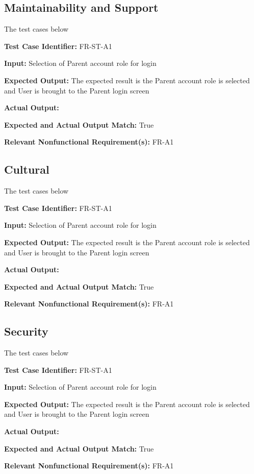 \documentclass[12pt, titlepage]{article}
\begin{document}
\subsection{Maintainability and Support}
\hspace{2em}The test cases below 

\begin{mdframed}[linewidth=0.5mm] \par
  \textbf{Test Case Identifier:} FR-ST-A1 \par
  \textbf{Input:} Selection of Parent account role for login \par
  \textbf{Expected Output:} The expected result is the Parent account role is selected and User is brought to the Parent login screen \par
  \textbf{Actual Output:} \par
  \textbf{Expected and Actual Output Match:} True \par
  \textbf{Relevant Nonfunctional Requirement(s):} FR-A1
\end{mdframed}

\subsection{Cultural}
\hspace{2em}The test cases below 

\begin{mdframed}[linewidth=0.5mm] \par
  \textbf{Test Case Identifier:} FR-ST-A1 \par
  \textbf{Input:} Selection of Parent account role for login \par
  \textbf{Expected Output:} The expected result is the Parent account role is selected and User is brought to the Parent login screen \par
  \textbf{Actual Output:} \par
  \textbf{Expected and Actual Output Match:} True \par
  \textbf{Relevant Nonfunctional Requirement(s):} FR-A1
\end{mdframed}

\subsection{Security}
\hspace{2em}The test cases below 

\begin{mdframed}[linewidth=0.5mm] \par
  \textbf{Test Case Identifier:} FR-ST-A1 \par
  \textbf{Input:} Selection of Parent account role for login \par
  \textbf{Expected Output:} The expected result is the Parent account role is selected and User is brought to the Parent login screen \par
  \textbf{Actual Output:} \par
  \textbf{Expected and Actual Output Match:} True \par
  \textbf{Relevant Nonfunctional Requirement(s):} FR-A1
\end{mdframed}
\end{document}
